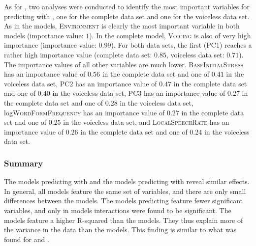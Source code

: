 As for , two  analyses were conducted to identify the most important variables for predicting  with , one for the complete data set and one for the voiceless data set. 
 As in the  models, \textsc{Environment} is clearly the most important variable in both models (importance value: $1$). In the complete model, \textsc{Voicing} is also of very high importance  (importance value: $0.99$). For both data sets, the first  (\textsc{PC1}) reaches a rather high importance value (complete data set: $0.85$,  voiceless data set: $0.71$). The importance values of all other variables are much lower.
\textsc{BaseInitialStress} has an importance value of $0.56$ in the complete data set and one of $0.41$ in the voiceless data set,   
\textsc{PC2} has an importance value of $0.47$ in the complete data set and one of $0.40$ in the voiceless data set,   
\textsc{PC3} has an importance value of $0.27$ in the complete data set and one of $0.28$ in the voiceless data set,   
log\textsc{WordFormFrequency} has an importance value of $0.27$ in the complete data set and one of $0.25$ in the voiceless data set, and  
\textsc{LocalSpeechRate} has an importance value of $0.26$ in the complete data set and one of $0.24$ in the voiceless data set.  

\subsubsection{Summary}


The models predicting  with  and the models predicting  with  reveal similar effects. In general, all models feature the same set of variables, and there are only small differences between the models. The models predicting  feature fewer significant variables, and only in  models interactions were found to be significant. 
The  models feature a higher R-squared than the  models. They thus explain more of the variance in the data than the  models. This finding is similar to what was found for  and . 

